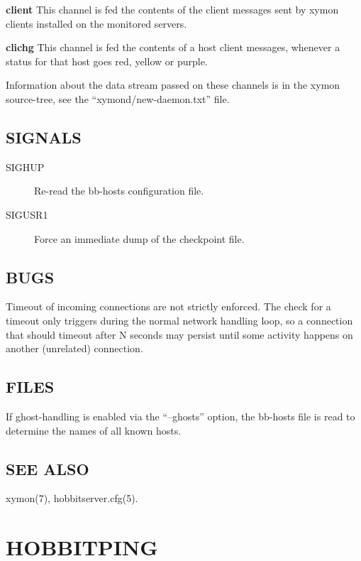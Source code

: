  \textbf{client}
 This channel is fed the contents of the client messages sent by xymon clients installed on the monitored servers. 


 \textbf{clichg}
 This channel is fed the contents of a host client messages, whenever a status for that host goes red, yellow or purple. 


  Information about the data stream passed on these channels is in the xymon source-tree, see the ``xymond/new-daemon.txt'' file. 


 
\subsection{SIGNALS}
\begin{description}
\item[SIGHUP] Re-read the bb-hosts configuration file. 

 

\item[SIGUSR1] Force an immediate dump of the checkpoint file. 

 


\end{description}
\subsection{BUGS}
 Timeout of incoming connections are not strictly enforced. The check for a timeout only triggers during the normal network handling loop, so a connection that should timeout after N seconds may persist until some activity happens on another (unrelated) connection. 

 
\subsection{FILES}
 If ghost-handling is enabled via the ``--ghosts'' option, the bb-hosts file is read to determine the names of all known hosts. 

 
\subsection{SEE ALSO}
xymon(7), hobbitserver.cfg(5). 
  

%
\newpage
\section{HOBBITPING}


